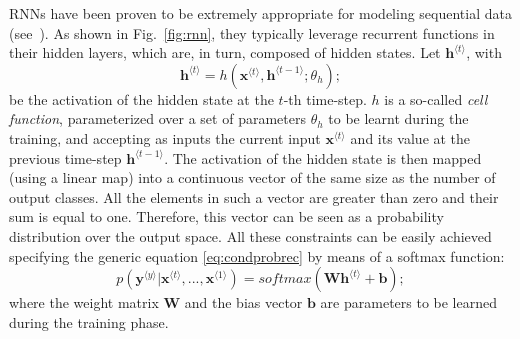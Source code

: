 RNNs have been proven to be extremely appropriate for modeling sequential
data (see~\cite{goodfellow2016dlbook}). As shown in Fig.~\ref{fig:rnn}, they typically leverage
recurrent functions in their hidden layers, which are, in turn, composed of hidden states. Let
$\mathbf{h}^{\langle t \rangle}$, with
\begin{equation}
  \label{eq:hidden}
  \mathbf{h}^{\langle t \rangle} = h(\mathbf{x}^{\langle t \rangle}, \mathbf{h}^{\langle t-1 \rangle}; \theta_{h});
\end{equation}
be the activation of the hidden state at the $t$-th time-step. $h$ is a so-called \emph{cell function}, parameterized over a set
of parameters $\theta_{h}$ to be learnt during the training, and accepting as inputs the current input $\mathbf{x}^{\langle t \rangle}$ and its value at the
previous time-step $\mathbf{h}^{\langle t-1 \rangle}$.
The activation of the hidden state is then mapped (using a linear map) into a continuous vector of the
same size as the number of output classes. All the elements in such a vector are greater than zero and their sum is equal to one. Therefore, this vector can be seen as a probability distribution over the output space.
All these constraints can be easily achieved specifying the generic equation \eqref{eq:condprobrec} by means of a softmax function:
%
\begin{equation}
  \label{eq:softmax}
  p(\mathbf{y}^{\langle y \rangle}|\mathbf{x}^{\langle t \rangle}, ..., \mathbf{x}^{\langle 1 \rangle}) =
  softmax(\mathbf{W}\mathbf{h}^{\langle t \rangle} + \mathbf{b});
\end{equation}
%
where the weight matrix $\mathbf{W}$ and the bias vector $\mathbf{b}$
are parameters to be learned during the training phase.


